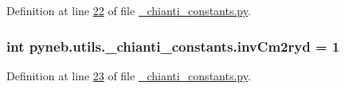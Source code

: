 Definition at line \hyperlink{__chianti__constants_8py_source_l00022}{22} of file \hyperlink{__chianti__constants_8py_source}{\-\_\-chianti\-\_\-constants.\-py}.

\hypertarget{namespacepyneb_1_1utils_1_1__chianti__constants_a4fbcb0c955e2a68274779b5ec0b14fd5}{
\subsubsection[{inv\-Cm2ryd}]{\setlength{\rightskip}{0pt plus 5cm}int pyneb.\-utils.\-\_\-chianti\-\_\-constants.\-inv\-Cm2ryd = 1}}\label{namespacepyneb_1_1utils_1_1__chianti__constants_a4fbcb0c955e2a68274779b5ec0b14fd5}


Definition at line \hyperlink{__chianti__constants_8py_source_l00023}{23} of file \hyperlink{__chianti__constants_8py_source}{\-\_\-chianti\-\_\-constants.\-py}.

